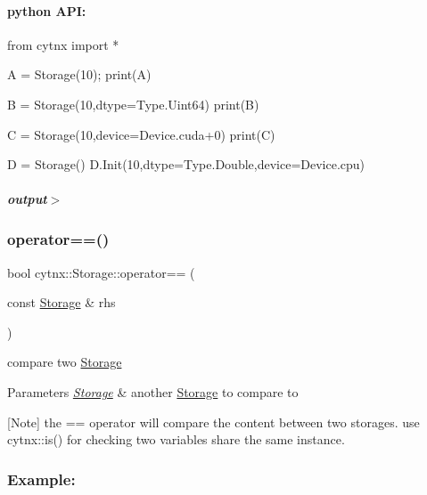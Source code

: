 \begin{DoxyVerbInclude}
\end{DoxyVerbInclude}
 \paragraph*{python A\+PI\+:}


\begin{DoxyCodeInclude}
\textcolor{keyword}{from} cytnx \textcolor{keyword}{import} *

A = Storage(10);
print(A)

B = Storage(10,dtype=Type.Uint64)
print(B)

C = Storage(10,device=Device.cuda+0)
print(C)

D = Storage()
D.Init(10,dtype=Type.Double,device=Device.cpu)


\end{DoxyCodeInclude}
 \subparagraph*{output$>$}


\begin{DoxyVerbInclude}
\end{DoxyVerbInclude}
 \mbox{\label{classcytnx_1_1Storage_ad304e00cf3d472ea0355af6b40c4529d}} 
\subsubsection{\texorpdfstring{operator==()}{operator==()}}
{\footnotesize\ttfamily bool cytnx\+::\+Storage\+::operator== (\begin{DoxyParamCaption}\item[{const \hyperlink{classcytnx_1_1Storage}{Storage} \&}]{rhs }\end{DoxyParamCaption})}



compare two \hyperlink{classcytnx_1_1Storage}{Storage} 


\begin{DoxyParams}{Parameters}
{\em \hyperlink{classcytnx_1_1Storage}{Storage}} & another \hyperlink{classcytnx_1_1Storage}{Storage} to compare to\\
\hline
\end{DoxyParams}
\mbox{[}Note\mbox{]} the == operator will compare the content between two storages. use cytnx\+::is() for checking two variables share the same instance.

\subsubsection*{Example\+:}

